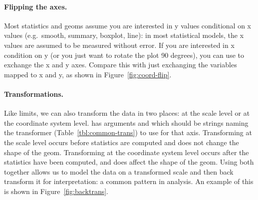 % 


\paragraph{Flipping the axes.}  Most statistics and geoms assume you are interested in y values conditional on x values (e.g.\ smooth, summary, boxplot, line): in most statistical models, the x values are assumed to be measured without error.  If you are interested in x condition on y (or you just want to rotate the plot 90 degrees), you can use  to exchange the x and y axes.  Compare this with just exchanging the variables mapped to x and y, as shown in Figure~\ref{fig:coord-flip}.

% 


\paragraph{Transformations.}  Like limits, we can also transform the data in two places: at the scale level or at the coordinate system level.  has arguments  and  which should be strings naming the transformer (Table~\ref{tbl:common-trans}) to use for that axis. Transforming at the scale level occurs before statistics are computed and does not change the shape of the geom.  Transforming at the coordinate system level occurs after the statistics have been computed, and does affect the shape of the geom.  Using both together allows us to model the data on a transformed scale and then back transform it for interpretation: a common pattern in analysis.  An example of this is shown in Figure~\ref{fig:backtrans}.

